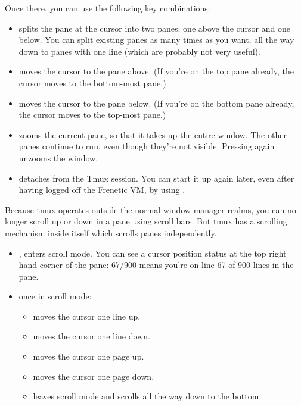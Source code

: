 Once there, you can use the following key combinations:

\begin{itemize}
\item {} \keystroke{=} splits the pane at the cursor into two panes: one above the cursor and one below.  
You can split existing panes as many times as you want, all the way down to panes with one line (which are probably
not very useful).   
\item {} \UArrow moves the cursor to the pane above.
(If you're on the top pane already, the cursor moves to the bottom-most pane.)
\item {} \DArrow moves the cursor to the pane below.
(If you're on the bottom pane already, the cursor moves to the top-most pane.)
\item {}  zooms the current pane, so that it takes up the entire window. 
The other panes continue to run, even though they're not visible.
Pressing   again unzooms the window.  
\item {}  detaches from the Tmux session.  
You can start it up again later, even after having logged off the Frenetic VM, by using 
.
\end{itemize}

Because tmux operates outside the normal window manager realms, you can no longer scroll up or down
in a pane using scroll bars.  
But tmux has a scrolling mechanism inside itself which scrolls panes independently.  

\begin{itemize}
\item {}, \keystroke{[} enters scroll mode.  
You can see a cursor position status at the top right hand corner of the pane: 67/900 means you're
on line 67 of 900 lines in the pane.   
\item once in scroll mode:
\begin{itemize}
\item \UArrow moves the cursor one line up.
\item \DArrow moves the cursor one line down.
\item \PgUp moves the cursor one page up.
\item \PgDown moves the cursor one page down.
\item\Esc leaves scroll mode and scrolls all the way down to the bottom
\end{itemize}
\end{itemize}

